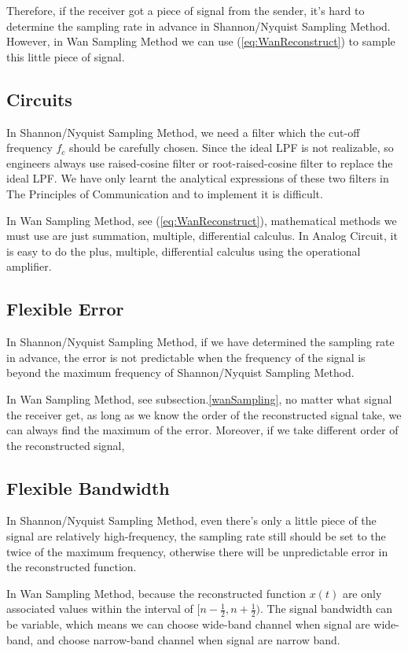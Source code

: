 \documentclass{article}
\begin{document}
Therefore, if the receiver got a piece of signal from the sender, it's hard to determine the sampling rate in advance in Shannon/Nyquist Sampling Method. However, in Wan Sampling Method we can use (\ref{eq:WanReconstruct}) to sample this little piece of signal.

\subsection{Circuits}
In Shannon/Nyquist Sampling Method, we need a filter which the cut-off frequency $f_c$ should be carefully chosen. Since the ideal LPF is not realizable, so engineers always use raised-cosine filter or root-raised-cosine filter to replace the ideal LPF. We have only learnt the analytical expressions of these two filters in The Principles of Communication and to implement it is difficult.

In Wan Sampling Method, see (\ref{eq:WanReconstruct}), mathematical methods we must use are just summation, multiple, differential calculus. In Analog Circuit, it is easy to do the plus, multiple, differential calculus using the operational amplifier.

\subsection{Flexible Error}
In Shannon/Nyquist Sampling Method, if we have determined the sampling rate in advance, the error is not predictable when the frequency of the signal is beyond the maximum frequency of Shannon/Nyquist Sampling Method.

In Wan Sampling Method, see subsection.\ref{wanSampling}, no matter what signal the receiver get, as long as we know the order of the reconstructed signal take, we can always find the maximum of the error. Moreover, if we take different order of the reconstructed signal,


\subsection{Flexible Bandwidth}
In Shannon/Nyquist Sampling Method, even there's only a little piece of the signal are relatively high-frequency, the sampling rate still should be set to the twice of the maximum frequency, otherwise there will be unpredictable error in the reconstructed function.

In Wan Sampling Method, because the reconstructed function $x(t)$ are only associated values within the interval of $[n - \frac12, n + \frac12)$. The signal bandwidth can be variable, which means we can choose wide-band channel when signal are wide-band, and choose narrow-band channel when signal are narrow band.
\end{document}
